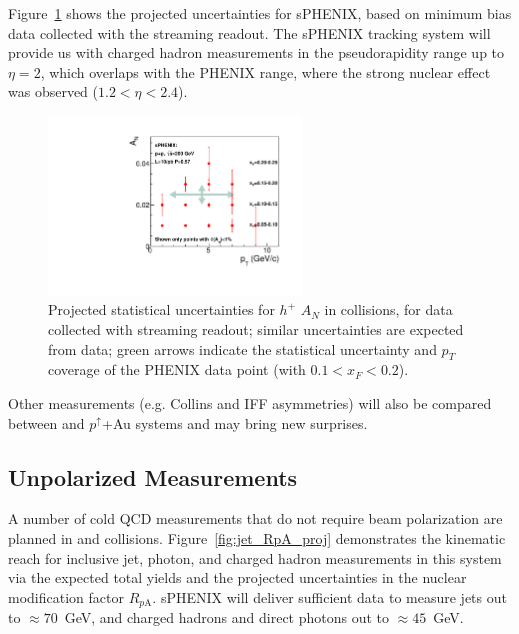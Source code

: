 Figure~\ref{fig:AN_h} shows the projected uncertainties for sPHENIX,
based on minimum bias data collected with the streaming readout. The sPHENIX
tracking system will provide us with charged hadron measurements in
the pseudorapidity range up to $\eta=2$, which overlaps with the
PHENIX range, where the strong nuclear effect was observed
($1.2<\eta<2.4$). 

\begin{figure}[htbp]
\centering
\includegraphics[width=0.60\textwidth]{figs/sphenix_han.pdf}
\caption{Projected statistical uncertainties for $h^{+}$ $A_N$ in
  \pp collisions, for data collected with streaming readout; similar
  uncertainties are expected from \pAu data; green arrows indicate
  the statistical uncertainty and $p_T$ coverage of the PHENIX data
  point (with $0.1<x_F<0.2$).} 
\label{fig:AN_h}
\end{figure}

Other measurements (e.g. Collins and IFF asymmetries) will also be
compared between \pp and $p^{\uparrow}$+Au systems and may bring new
surprises. 


\subsection {Unpolarized Measurements}

A number of cold QCD measurements that do not require beam
polarization are planned in \pp and \pA collisions. Figure~\ref{fig:jet_RpA_proj} demonstrates the kinematic reach for inclusive jet, photon, and charged hadron measurements in this system via the expected total yields and the projected uncertainties in the nuclear modification factor $R_{p\mathrm{A}}$. sPHENIX will deliver sufficient data to measure jets out to $\approx 70$~GeV, and charged hadrons and direct photons out to $\approx 45$~GeV.

